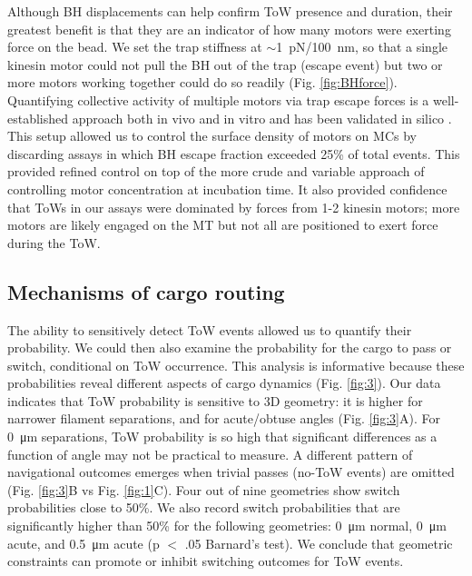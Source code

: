 Although BH displacements can help confirm ToW presence and duration, their greatest benefit is that they are an indicator of how many motors were exerting force on the bead. We set the trap stiffness at $\sim$\SI{1}{\pico\newton}/\SI{100}{\nano\meter}, so that a single kinesin motor could not pull the BH out of the trap (escape event) but two or more motors working together could do so readily (Fig. \ref{fig:BHforce}). Quantifying collective activity of multiple motors via trap escape forces is a well-established approach both in vivo \cite{Ashkin1990,Gross2002} and in vitro \cite{McKenney2010} and has been validated in silico \cite{McKenney2010}. This setup allowed us to control the surface density of motors on MCs by discarding assays in which BH escape fraction exceeded 25\% of total events. This provided refined control on top of the more crude and variable approach of controlling motor concentration at incubation time. It also provided confidence that ToWs in our assays were dominated by forces from 1-2 kinesin motors; more motors are likely engaged on the MT but not all are positioned to exert force during the ToW.

\subsection{Mechanisms of cargo routing}

The ability to sensitively detect ToW events allowed us to quantify their probability. We could then also examine the probability for the cargo to pass or switch, conditional on ToW occurrence. This analysis is informative because these probabilities reveal different aspects of cargo dynamics (Fig. \ref{fig:3}). Our data indicates that ToW probability is sensitive to 3D geometry: it is higher for narrower filament separations, and for acute/obtuse angles (Fig. \ref{fig:3}A). For \SI{0}{\micro\meter} separations, ToW probability is so high that significant differences as a function of angle may not be practical to measure. A different pattern of navigational outcomes emerges when trivial passes (no-ToW events) are omitted (Fig. \ref{fig:3}B vs Fig. \ref{fig:1}C). Four out of nine geometries show switch probabilities close to 50\%. We also record switch probabilities that are significantly higher than 50\% for the following geometries: \SI{0}{\micro\meter} normal, \SI{0}{\micro\meter} acute, and \SI{.5}{\micro\meter} acute (p $<$ .05 Barnard's test). We conclude that geometric constraints can promote or inhibit switching outcomes for ToW events.

